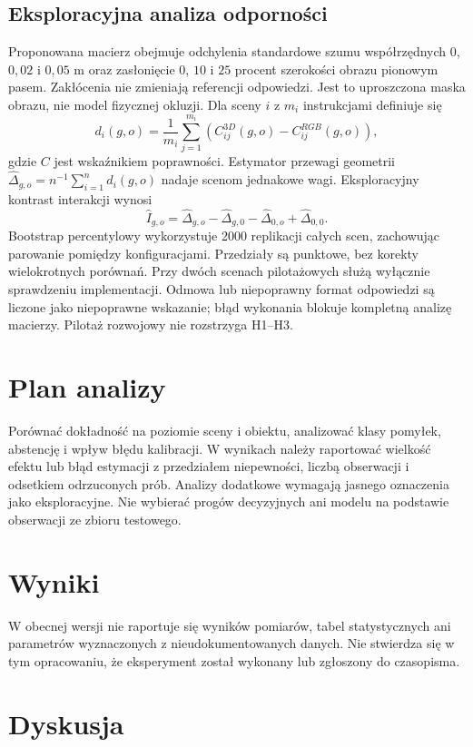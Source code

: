 \documentclass[11pt,a4paper]{article}
\begin{document}
\subsection{Eksploracyjna analiza odporności}
Proponowana macierz obejmuje odchylenia standardowe szumu współrzędnych
$0$, $0{,}02$ i $0{,}05$ m oraz zasłonięcie $0$, $10$ i $25$ procent
szerokości obrazu pionowym pasem. Zakłócenia nie zmieniają referencji
odpowiedzi. Jest to uproszczona maska obrazu, nie model fizycznej okluzji.
Dla sceny $i$ z $m_i$ instrukcjami definiuje się
\[
 d_i(g,o)=\frac{1}{m_i}\sum_{j=1}^{m_i}
 (C_{ij}^{3D}(g,o)-C_{ij}^{RGB}(g,o)),
\]
gdzie $C$ jest wskaźnikiem poprawności. Estymator przewagi geometrii
$\widehat\Delta_{g,o}=n^{-1}\sum_{i=1}^{n}d_i(g,o)$ nadaje scenom jednakowe wagi.
Eksploracyjny kontrast interakcji wynosi
\[
 \widehat I_{g,o}=\widehat\Delta_{g,o}-\widehat\Delta_{g,0}
 -\widehat\Delta_{0,o}+\widehat\Delta_{0,0}.
\]
Bootstrap percentylowy wykorzystuje 2000 replikacji całych scen, zachowując
parowanie pomiędzy konfiguracjami. Przedziały są punktowe, bez korekty
wielokrotnych porównań. Przy dwóch scenach pilotażowych służą wyłącznie
sprawdzeniu implementacji. Odmowa lub niepoprawny format odpowiedzi są
liczone jako niepoprawne wskazanie; błąd wykonania blokuje kompletną
analizę macierzy. Pilotaż rozwojowy nie rozstrzyga H1--H3.

\section{Plan analizy}

Porównać dokładność na poziomie sceny i obiektu, analizować klasy pomyłek, abstencję i wpływ błędu kalibracji. W wynikach należy raportować wielkość efektu lub błąd estymacji z przedziałem niepewności, liczbą obserwacji i odsetkiem odrzuconych prób. Analizy dodatkowe wymagają jasnego oznaczenia jako eksploracyjne. Nie wybierać progów decyzyjnych ani modelu na podstawie obserwacji ze zbioru testowego.

\section{Wyniki}

W obecnej wersji nie raportuje się wyników pomiarów, tabel statystycznych ani parametrów wyznaczonych z nieudokumentowanych danych. Nie stwierdza się w tym opracowaniu, że eksperyment został wykonany lub zgłoszony do czasopisma.

\section{Dyskusja}
\end{document}
